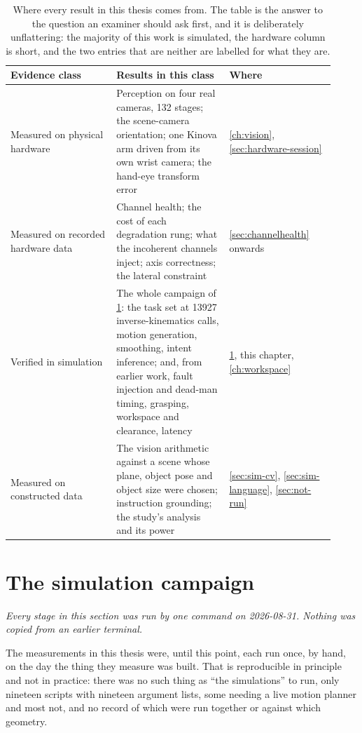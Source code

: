 \begin{table}[htbp]
  \centering
  \small
  \caption[Where each result comes from]{Where every result in this thesis
  comes from. The table is the answer to the question an examiner should ask
  first, and it is deliberately unflattering: the majority of this work is
  simulated, the hardware column is short, and the two entries that are
  neither are labelled for what they are.}
  \label{tab:evidence-map}
  \begin{tabular}{@{}p{0.30\linewidth}p{0.32\linewidth}p{0.30\linewidth}@{}}
    \toprule
    Evidence class & Results in this class & Where \\
    \midrule
    Measured on physical hardware
      & Perception on four real cameras, \num{132} stages; the scene-camera
        orientation; one Kinova arm driven from its own wrist camera; the
        hand-eye transform error
      & \cref{ch:vision}, \cref{sec:hardware-session} \\
    Measured on recorded hardware data
      & Channel health; the cost of each degradation rung; what the incoherent
        channels inject; axis correctness; the lateral constraint
      & \cref{sec:channelhealth} onwards \\
    Verified in simulation
      & The whole campaign of \cref{sec:campaign}: the task set at
        \num{13927} inverse-kinematics calls, motion generation, smoothing,
        intent inference; and, from earlier work, fault injection and
        dead-man timing, grasping, workspace and clearance, latency
      & \cref{sec:campaign}, this chapter, \cref{ch:workspace} \\
    Measured on constructed data
      & The vision arithmetic against a scene whose plane, object pose and
        object size were chosen; instruction grounding; the study's analysis
        and its power
      & \cref{sec:sim-cv}, \cref{sec:sim-language},
        \cref{sec:not-run} \\
    \bottomrule
  \end{tabular}
\end{table}

\section{The simulation campaign}
\label{sec:campaign}

\emph{Every stage in this section was run by one command on
2026-08-31. Nothing was copied from an earlier terminal.}

The measurements in this thesis were, until this point, each run once, by
hand, on the day the thing they measure was built. That is reproducible in
principle and not in practice: there was no such thing as ``the
simulations'' to run, only nineteen scripts with nineteen argument lists,
some needing a live motion planner and most not, and no record of which were
run together or against which geometry.

